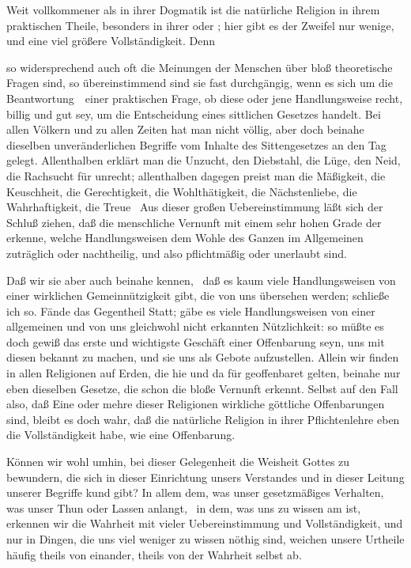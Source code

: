 Weit vollkommener als in ihrer Dogmatik ist die natürliche Religion in ihrem praktischen Theile, besonders in ihrer  oder ; hier gibt es der Zweifel nur wenige, und eine viel größere Vollständigkeit. Denn 
\begin{aufza}
\item so widersprechend auch oft die Meinungen der Menschen über bloß theoretische Fragen sind, so übereinstimmend sind sie fast durchgängig, wenn es sich um die Beantwortung~\ einer praktischen Frage, ob diese oder jene Handlungsweise recht, billig und gut sey, um die Entscheidung eines sittlichen Gesetzes handelt. Bei allen Völkern und zu allen Zeiten hat man nicht völlig, aber doch beinahe dieselben unveränderlichen Begriffe vom Inhalte des Sittengesetzes an den Tag gelegt. Allenthalben erklärt man die Unzucht, den Diebstahl, die Lüge, den Neid, die Rachsucht für unrecht; allenthalben dagegen preist man die Mäßigkeit, die Keuschheit, die Gerechtigkeit, die Wohlthätigkeit, die Nächstenliebe, die Wahrhaftigkeit, die Treue \usw\ Aus dieser großen Uebereinstimmung läßt sich der Schluß ziehen, daß die menschliche Vernunft mit einem sehr hohen Grade der  erkenne, welche Handlungsweisen dem Wohle des Ganzen im Allgemeinen zuträglich oder nachtheilig, und also pflichtmäßig oder unerlaubt sind.
\item Daß wir sie aber auch beinahe  kennen, \dh\ daß es kaum viele Handlungsweisen von einer wirklichen Gemeinnützigkeit gibt, die von uns übersehen werden; schließe ich so. Fände das Gegentheil Statt; gäbe es viele Handlungsweisen von einer allgemeinen und von uns gleichwohl nicht erkannten Nützlichkeit: so müßte es doch gewiß das erste und wichtigste Geschäft einer Offenbarung seyn, uns mit diesen bekannt zu machen, und sie uns als Gebote aufzustellen. Allein wir finden in allen Religionen auf Erden, die hie und da für geoffenbaret gelten, beinahe nur eben dieselben Gesetze, die schon die bloße Vernunft erkennt. Selbst auf den Fall also, daß Eine oder mehre dieser Religionen wirkliche göttliche Offenbarungen sind, bleibt es doch wahr, daß die natürliche Religion in ihrer Pflichtenlehre  eben die Vollständigkeit habe, wie eine Offenbarung.
\end{aufza}
\begin{RWanm}
Können wir wohl umhin, bei dieser Gelegenheit die Weisheit Gottes zu bewundern, die sich in dieser Einrichtung unsers Verstandes und in dieser Leitung unserer Begriffe kund gibt? In allem dem, was unser gesetzmäßiges Verhalten, was unser Thun oder Lassen anlangt, \dh\ in dem, was uns zu wissen am  ist, erkennen wir die Wahrheit mit vieler Uebereinstimmung und Vollständigkeit, und nur in Dingen, die uns viel weniger zu wissen nöthig sind, weichen unsere Urtheile häufig theils von einander, theils von der Wahrheit selbst ab.~ 
\end{RWanm}

